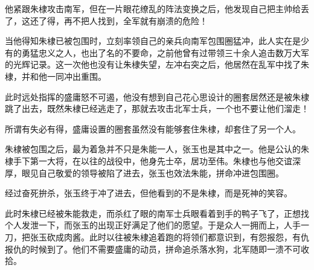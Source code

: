 \begin{multicols}{\theparacolNo}
		他紧跟朱棣攻击南军，但在一片眼花缭乱的阵法变换之后，他发现自己把主帅给丢了，这还了得，再不把人找到，全军就有崩溃的危险！

		当他得知朱棣已被包围时，立刻率领自己的亲兵向南军包围圈猛冲，此人实在是少有的勇猛忠义之人，也出了名的不要命，之前他曾有过带领三十余人追击数万大军的光辉记录。这一次他也没有让朱棣失望，左冲右突之后，他居然在乱军中找了朱棣，并和他一同冲出重围。

		此时远处指挥的盛庸怒不可遏，他没有想到自己花心思设计的圈套居然还是被朱棣跳了出去，既然朱棣已经逃走了，那就去攻击北军士兵，一个也不要让他们溜走！

		所谓有失必有得，盛庸设置的圈套虽然没有能够套住朱棣，却套住了另一个人。

		朱棣被包围之后，最为着急并不只是朱能一人，张玉也是其中之一。他是公认的朱棣手下第一大将，在以往的战役中，他身先士卒，居功至伟。朱棣也与他交谊深厚，眼见自己敬爱的领导被陷了进去，张玉也效法朱能，拼命冲进包围圈。

		经过奋死拚杀，张玉终于冲了进去，但他看到的不是朱棣，而是死神的笑容。

		此时朱棣已经被朱能救走，而杀红了眼的南军士兵眼看着到手的鸭子飞了，正想找个人发泄一下，而张玉的出现正好满足了他们的愿望。于是众人一拥而上，人手一刀，把张玉砍成肉酱。此时以往被朱棣追着跑的将领们都意识到，有怨报怨，有仇报仇的时候到了。他们不需要盛庸的动员，拼命追杀落水狗，北军随即一溃不可收拾。
		\ifnum{}
	\end{multicols}
\fi
\newpage
